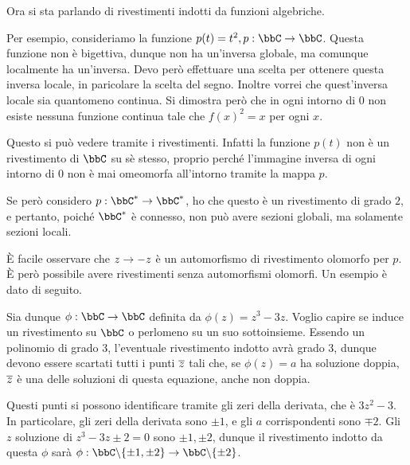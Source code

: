 Ora si sta parlando di rivestimenti indotti da funzioni algebriche.

Per esempio, consideriamo la funzione $p(t)=t^2, p:\bbC\rar\bbC$. Questa funzione non è bigettiva, dunque non ha un'inversa globale, ma comunque localmente ha un'inversa. Devo però effettuare una scelta per ottenere questa inversa locale, in paricolare la scelta del segno. Inoltre vorrei che quest'inversa locale sia quantomeno continua. Si dimostra però che in ogni intorno di $0$ non esiste nessuna funzione continua tale che $f(x)^2=x$ per ogni $x$.

Questo si può vedere tramite i rivestimenti. Infatti la funzione $p(t)$ non è un rivestimento di $\bbC$ su sè stesso, proprio perché l'immagine inversa di ogni intorno di $0$ non è mai omeomorfa all'intorno tramite la mappa $p$.

Se però considero $p:\bbC^*\rar\bbC^*$, ho che questo è un rivestimento di grado $2$, e pertanto, poiché $\bbC^*$ è connesso, non può avere sezioni globali, ma solamente sezioni locali.

È facile osservare che $z\rightarrow-z$ è un automorfismo di rivestimento olomorfo per $p$. È però possibile avere rivestimenti senza automorfismi olomorfi. Un esempio è dato di seguito.

Sia dunque $\phi:\bbC\rar\bbC$ definita da $\phi(z)=z^3-3z$. Voglio capire se induce un rivestimento su $\bbC$ o perlomeno su un suo sottoinsieme.
Essendo un polinomio di grado $3$, l'eventuale rivestimento indotto avrà grado $3$, dunque devono essere scartati tutti i punti $\overline{z}$ tali che, se $\phi(z)=a$ ha soluzione doppia, $\overline{z}$ è una delle soluzioni di questa equazione, anche non doppia.

Questi punti si possono identificare tramite gli zeri della derivata, che è $3z^2-3$. In particolare, gli zeri della derivata sono $\pm1$, e gli $a$ corrispondenti sono $\mp2$. Gli $z$ soluzione di $z^3-3z\pm2=0$ sono $\pm1,\pm2$, dunque il rivestimento indotto da questa $\phi$ sarà $\phi:\bbC\minus\{\pm1,\pm2\}\rar\bbC\minus\{\pm2\}$.


